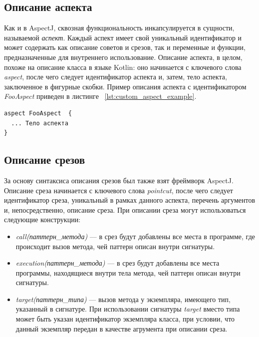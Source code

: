 \subsection{Описание аспекта}
\label{sub:custom_aspect_syntax}
Как и в AspectJ, сквозная функциональность инкапсулируется в сущности,
называемой \textit{аспект}.
Каждый аспект имеет свой уникальный идентификатор и может содержать как описание
советов и срезов, так и переменные и функции, предназначенные для внутреннего
использование.
Описание аспекта, в целом, похоже на описание класса в языке Kotlin: оно
начинается с ключевого слова \textit{aspect}, после чего следует идентификатор
аспекта и, затем, тело аспекта, заключенное в фигурные скобки.
Пример описания аспекта с идентификатором \textit{FooAspect} приведен в листинге
~\ref{lst:custom_aspect_example}.
  \begin{lstlisting}[style={java}, label={lst:custom_aspect_example}, 
  caption={Пример описания аспекта в разрабатываемом прототипе}]
aspect FooAspect  {
  ... Тело аспекта
}
  \end{lstlisting}
\subsection{Описание срезов}
\label{sub:custom_pointcut_syntax}
За основу синтаксиса описания срезов был также взят фреймворк AspectJ.
Описание среза начинается с ключевого слова \textit{pointcut}, после чего
следует идентификатор среза, уникальный в рамках данного аспекта, перечень
аргументов и, непосредственно, описание среза.
При описании среза могут использоваться следующие конструкции:
\begin{itemize}
	\item \textit{call(паттерн\_метода)} --- в срез будут добавлены все места в
		  программе, где происходит вызов метода, чей паттерн описан внутри
	  	сигнатуры.
	\item \textit{execution(паттерн\_метода)} --- в срез будут добавлены все
		  места программы, находящиеся внутри тела метода, чей паттерн описан внутри
		  сигнатуры.
	\item \textit{target(паттерн\_типа)} --- вызов метода у экземпляра, имеющего
		  тип, указанный в сигнатуре.
		  При использовании сигнатуры \textit{target} вместо типа может быть указан
		  идентификатор экземпляра класса, при условии, что данный экземпляр передан
		  в качестве агрумента при описании среза.
\end{itemize}

